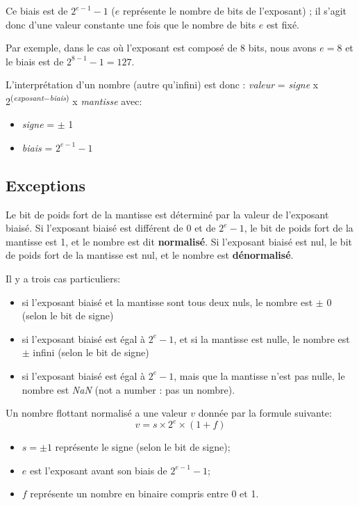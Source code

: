 \documentclass[
  letterpaper,
]{scrbook}
\providecommand{\tightlist}{%
  \setlength{\itemsep}{0pt}\setlength{\parskip}{0pt}}\usepackage{longtable,booktabs,array}
\theoremstyle{plain}
\theoremstyle{definition}
\theoremstyle{definition}
\theoremstyle{remark}
\begin{document}
Ce biais est de \(2^{e-1}-1\) (\(e\) représente le nombre de bits de
l'exposant) ; il s'agit donc d'une valeur constante une fois que le
nombre de bits \(e\) est fixé.

Par exemple, dans le cas où l'exposant est composé de 8 bits, nous avons
\(e=8\) et le biais est de \(2^{8-1}-1=127\).

L'interprétation d'un nombre (autre qu'infini) est donc : \emph{valeur}
= \emph{signe} x 2\textsuperscript{(\emph{exposant}−\emph{biais})} x
\emph{mantisse} avec:

\begin{itemize}
\tightlist
\item
  \emph{signe} = \(\pm\) 1
\item
  \emph{biais} = \(2^{e-1}-1\)
\end{itemize}

\hypertarget{exceptions}{%
\subsection*{Exceptions}\label{exceptions}}

Le bit de poids fort de la mantisse est déterminé par la valeur de
l'exposant biaisé. Si l'exposant biaisé est différent de 0 et de
\(2^e-1\), le bit de poids fort de la mantisse est 1, et le nombre est
dit \textbf{normalisé}. Si l'exposant biaisé est nul, le bit de poids
fort de la mantisse est nul, et le nombre est \textbf{dénormalisé}.

Il y a trois cas particuliers:

\begin{itemize}
\tightlist
\item
  si l'exposant biaisé et la mantisse sont tous deux nuls, le nombre est
  \(\pm\) 0 (selon le bit de signe)
\item
  si l'exposant biaisé est égal à \(2^e-1\), et si la mantisse est
  nulle, le nombre est \(\pm\) infini (selon le bit de signe)
\item
  si l'exposant biaisé est égal à \(2^e-1\), mais que la mantisse n'est
  pas nulle, le nombre est \emph{NaN} (not a number : pas un nombre).
\end{itemize}

Un nombre flottant normalisé a une valeur \(v\) donnée par la formule
suivante: \[
v = s \times 2^e \times (1+f)
\]

\begin{itemize}
\tightlist
\item
  \(s=\pm 1\) représente le signe (selon le bit de signe);
\item
  \(e\) est l'exposant avant son biais de \(2^{e-1}-1\);
\item
  \(f\) représente un nombre en binaire compris entre 0 et 1.
\end{itemize}
\end{document}
